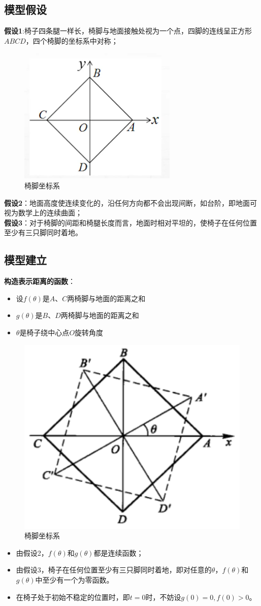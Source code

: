 \documentclass[openany]{progbookcn}
\begin{document}
\subsection{模型假设}
\textbf{假设1}:椅子四条腿一样长，椅脚与地面接触处视为一个点，四脚的连线呈正方形$ABCD$，四个椅脚的坐标系中对称；
\begin{figure}[H]
\centering
\includegraphics[width=0.3 \textwidth]{figs/chapter3/正方形}
\caption{椅脚坐标系}
\end{figure}

\textbf{假设2}：地面高度使连续变化的，沿任何方向都不会出现间断，如台阶，即地面可视为数学上的连续曲面；\\
\indent \textbf{假设3}：对于椅脚的间距和椅腿长度而言，地面时相对平坦的，使椅子在任何位置至少有三只脚同时着地。


\subsection{模型建立}
\textbf{构造表示距离的函数}：
\begin{itemize}
\item 设$f(\theta)$是$A$、$C$两椅脚与地面的距离之和
\item $g(\theta)$是$B$、$D$两椅脚与地面的距离之和
\item $\theta$是椅子绕中心点$O$旋转角度
\end{itemize}
\begin{figure}[H]
\centering
\includegraphics[width=0.3 \textwidth]{figs/chapter3/正方形旋转}
\caption{椅脚坐标系}
\end{figure}
\begin{itemize}
\item 由假设2，$f(\theta)$和$g(\theta)$都是连续函数；
\item 由假设3，椅子在任何位置至少有三只脚同时着地，即对任意的$\theta$，$f(\theta)$和$g(\theta)$中至少有一个为零函数。
\item 在椅子处于初始不稳定的位置时，即$t=0$时，不妨设$g(0)=0,f(0)>0$。
\end{itemize}
\end{document}
